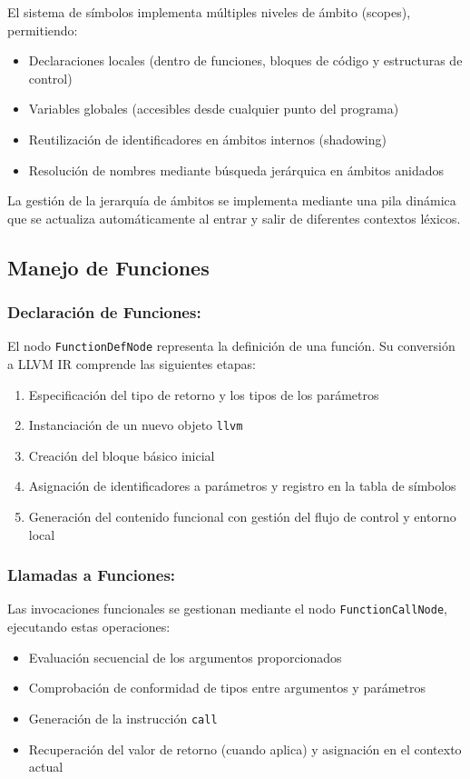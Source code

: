 \documentclass{article}
\begin{document}
El sistema de símbolos implementa múltiples niveles de ámbito (scopes), permitiendo:
\begin{itemize}
    \item Declaraciones locales (dentro de funciones, bloques de código y estructuras de control)
    \item Variables globales (accesibles desde cualquier punto del programa)
    \item Reutilización de identificadores en ámbitos internos (shadowing)
    \item Resolución de nombres mediante búsqueda jerárquica en ámbitos anidados
\end{itemize}

La gestión de la jerarquía de ámbitos se implementa mediante una pila dinámica que se actualiza automáticamente al entrar y salir de diferentes contextos léxicos.

\subsection{Manejo de Funciones}

\subsubsection{Declaración de Funciones:}

El nodo \texttt{FunctionDefNode} representa la definición de una función. Su conversión a LLVM IR comprende las siguientes etapas:
\begin{enumerate}
    \item Especificación del tipo de retorno y los tipos de los parámetros
    \item Instanciación de un nuevo objeto \texttt{llvm}
    \item Creación del bloque básico inicial
    \item Asignación de identificadores a parámetros y registro en la tabla de símbolos
    \item Generación del contenido funcional con gestión del flujo de control y entorno local
\end{enumerate}

\subsubsection{Llamadas a Funciones:}

Las invocaciones funcionales se gestionan mediante el nodo \texttt{FunctionCallNode}, ejecutando estas operaciones:
\begin{itemize}
    \item Evaluación secuencial de los argumentos proporcionados
    \item Comprobación de conformidad de tipos entre argumentos y parámetros
    \item Generación de la instrucción \texttt{call}
    \item Recuperación del valor de retorno (cuando aplica) y asignación en el contexto actual
\end{itemize}
\end{document}
